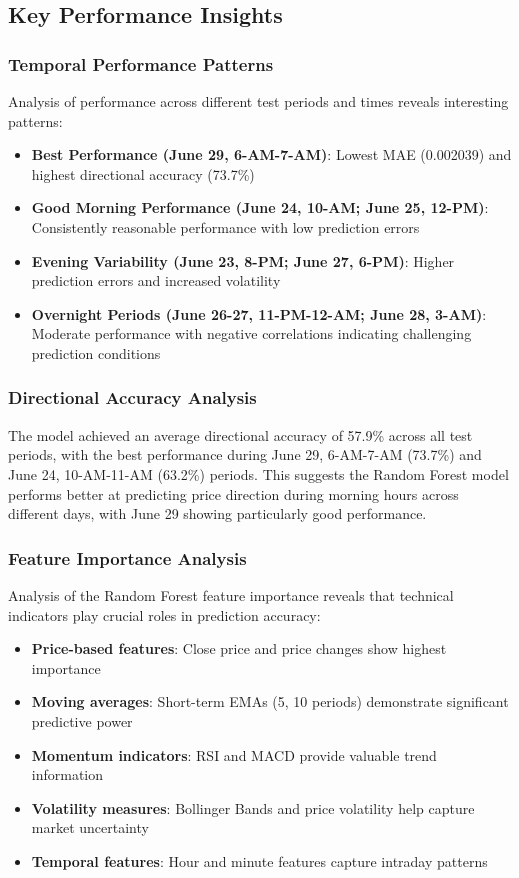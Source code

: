 \documentclass[11pt,a4paper]{article}
\begin{document}
\subsection{Key Performance Insights}

\subsubsection{Temporal Performance Patterns}

Analysis of performance across different test periods and times reveals interesting patterns:

\begin{itemize}
    \item \textbf{Best Performance (June 29, 6-AM-7-AM)}: Lowest MAE (0.002039) and highest directional accuracy (73.7\%)
    \item \textbf{Good Morning Performance (June 24, 10-AM; June 25, 12-PM)}: Consistently reasonable performance with low prediction errors
    \item \textbf{Evening Variability (June 23, 8-PM; June 27, 6-PM)}: Higher prediction errors and increased volatility
    \item \textbf{Overnight Periods (June 26-27, 11-PM-12-AM; June 28, 3-AM)}: Moderate performance with negative correlations indicating challenging prediction conditions
\end{itemize}

\subsubsection{Directional Accuracy Analysis}

The model achieved an average directional accuracy of 57.9\% across all test periods, with the best performance during June 29, 6-AM-7-AM (73.7\%) and June 24, 10-AM-11-AM (63.2\%) periods. This suggests the Random Forest model performs better at predicting price direction during morning hours across different days, with June 29 showing particularly good performance.

\subsubsection{Feature Importance Analysis}

Analysis of the Random Forest feature importance reveals that technical indicators play crucial roles in prediction accuracy:

\begin{itemize}
    \item \textbf{Price-based features}: Close price and price changes show highest importance
    \item \textbf{Moving averages}: Short-term EMAs (5, 10 periods) demonstrate significant predictive power
    \item \textbf{Momentum indicators}: RSI and MACD provide valuable trend information
    \item \textbf{Volatility measures}: Bollinger Bands and price volatility help capture market uncertainty
    \item \textbf{Temporal features}: Hour and minute features capture intraday patterns
\end{itemize}
\end{document}
